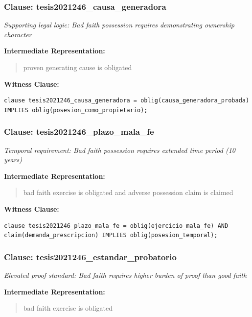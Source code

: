 \documentclass[11pt,a4paper]{article}
\begin{document}
\subsubsection{Clause: tesis2021246\_causa\_generadora}

\textit{Supporting legal logic: Bad faith possession requires demonstrating ownership character}

\textbf{Intermediate Representation:}

\begin{quote}
proven generating cause is obligated
\end{quote}

\textbf{Witness Clause:}

\begin{lstlisting}[style=witnessstyle, language=Witness]
clause tesis2021246_causa_generadora = oblig(causa_generadora_probada) IMPLIES oblig(posesion_como_propietario);
\end{lstlisting}

\subsubsection{Clause: tesis2021246\_plazo\_mala\_fe}

\textit{Temporal requirement: Bad faith possession requires extended time period (10 years)}

\textbf{Intermediate Representation:}

\begin{quote}
bad faith exercise is obligated and adverse possession claim is claimed
\end{quote}

\textbf{Witness Clause:}

\begin{lstlisting}[style=witnessstyle, language=Witness]
clause tesis2021246_plazo_mala_fe = oblig(ejercicio_mala_fe) AND claim(demanda_prescripcion) IMPLIES oblig(posesion_temporal);
\end{lstlisting}

\subsubsection{Clause: tesis2021246\_estandar\_probatorio}

\textit{Elevated proof standard: Bad faith requires higher burden of proof than good faith}

\textbf{Intermediate Representation:}

\begin{quote}
bad faith exercise is obligated
\end{quote}
\end{document}
